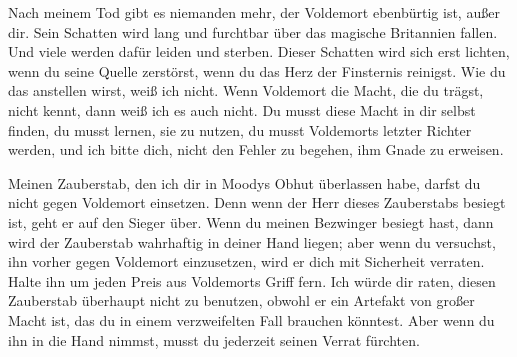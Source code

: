 \begin{writtenNote}
Nach meinem Tod gibt es niemanden mehr, der Voldemort ebenbürtig ist, außer dir. Sein Schatten wird lang und furchtbar über das magische Britannien fallen. Und viele werden dafür leiden und sterben. Dieser Schatten wird sich erst lichten, wenn du seine Quelle zerstörst, wenn du das Herz der Finsternis reinigst. Wie du das anstellen wirst, weiß ich nicht. Wenn Voldemort die Macht, die du trägst, nicht kennt, dann weiß ich es auch nicht. Du musst diese Macht in dir selbst finden, du musst lernen, sie zu nutzen, du musst Voldemorts letzter Richter werden, und ich bitte dich, nicht den Fehler zu begehen, ihm Gnade zu erweisen.

Meinen Zauberstab, den ich dir in Moodys Obhut überlassen habe, darfst du nicht gegen Voldemort einsetzen. Denn wenn der Herr dieses Zauberstabs besiegt ist, geht er auf den Sieger über. Wenn du meinen Bezwinger besiegt hast, dann wird der Zauberstab wahrhaftig in deiner Hand liegen; aber wenn du versuchst, ihn vorher gegen Voldemort einzusetzen, wird er dich mit Sicherheit verraten. Halte ihn um jeden Preis aus Voldemorts Griff fern. Ich würde dir raten, diesen Zauberstab überhaupt nicht zu benutzen, obwohl er ein Artefakt von großer Macht ist, das du in einem verzweifelten Fall brauchen könntest. Aber wenn du ihn in die Hand nimmst, musst du jederzeit seinen Verrat fürchten.


\end{writtenNote}
